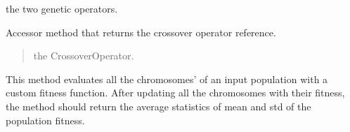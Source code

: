\documentclass[letterpaper,10pt,english]{sphinxmanual}
\begin{document}
\begin{fulllineitems}
\begin{fulllineitems}
\begin{quote}
\begin{description}
\end{description}\end{quote}

\sphinxAtStartPar
the two genetic operators.

\end{fulllineitems}


\begin{fulllineitems}
\label{\detokenize{pygenalgo.engines:pygenalgo.engines.generic_ga.GenericGA.crossover_op}}
\pysigstartsignatures
\pysigline
{}
\pysigstopsignatures
\sphinxAtStartPar
Accessor method that returns the crossover operator reference.
\begin{quote}\begin{description}
\sphinxAtStartPar
the CrossoverOperator.

\end{description}\end{quote}

\end{fulllineitems}


\begin{fulllineitems}
\label{\detokenize{pygenalgo.engines:pygenalgo.engines.generic_ga.GenericGA.evaluate_fitness}}
\pysigstartsignatures
\pysiglinewithargsret
{}
{\sphinxparamcomma {}}
{}
\pysigstopsignatures
\sphinxAtStartPar
This method evaluates all the chromosomes’ of an input population
with a custom fitness function. After updating all the chromosomes
with their fitness, the method should return the average statistics
of mean and std of the population fitness.

\end{fulllineitems}


\end{fulllineitems}
\end{document}

